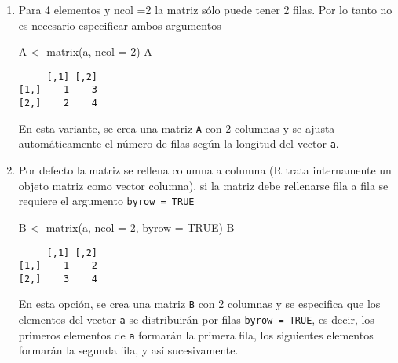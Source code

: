 \documentclass[
  a4paper,
]{article}
\newenvironment{Shaded}{}{}
\newcommand{\AttributeTok}[1]{\textcolor[rgb]{0.84,0.23,0.29}{#1}}
\newcommand{\ConstantTok}[1]{\textcolor[rgb]{0.00,0.36,0.77}{#1}}
\newcommand{\DecValTok}[1]{\textcolor[rgb]{0.00,0.36,0.77}{#1}}
\newcommand{\FunctionTok}[1]{\textcolor[rgb]{0.44,0.26,0.76}{#1}}
\newcommand{\NormalTok}[1]{\textcolor[rgb]{0.14,0.16,0.18}{#1}}
\newcommand{\OtherTok}[1]{\textcolor[rgb]{0.44,0.26,0.76}{#1}}
\begin{document}
\begin{enumerate}
\begin{verbatim}
     [,1] [,2]
[1,]    1    3
[2,]    2    4
\end{verbatim}

  Aquí se utiliza la función \texttt{matrix()} para crear una matriz
  \texttt{A} a partir de los elementos del vector \texttt{a}. Se
  especifica que la matriz tendrá 2 columnas y 2 filas. Los argumentos
  nrow y ncol indican el número de filas y el número de columnas de que
  consta la matriz resultante.
\item
  Para 4 elementos y ncol =2 la matriz sólo puede tener 2 filas. Por lo
  tanto no es necesario especificar ambos argumentos

\begin{Shaded}
\begin{Highlighting}[]
\NormalTok{A }\OtherTok{\textless{}{-}} \FunctionTok{matrix}\NormalTok{(a, }\AttributeTok{ncol =} \DecValTok{2}\NormalTok{)}
\NormalTok{A}
\end{Highlighting}
\end{Shaded}

\begin{verbatim}
     [,1] [,2]
[1,]    1    3
[2,]    2    4
\end{verbatim}

  En esta variante, se crea una matriz \texttt{A} con 2 columnas y se
  ajusta automáticamente el número de filas según la longitud del vector
  \texttt{a}.
\item
  Por defecto la matriz se rellena columna a columna (R trata
  internamente un objeto matriz como vector columna). si la matriz debe
  rellenarse fila a fila se requiere el argumento
  \texttt{byrow\ =\ TRUE}

\begin{Shaded}
\begin{Highlighting}[]
\NormalTok{B }\OtherTok{\textless{}{-}} \FunctionTok{matrix}\NormalTok{(a, }\AttributeTok{ncol =} \DecValTok{2}\NormalTok{, }\AttributeTok{byrow =} \ConstantTok{TRUE}\NormalTok{)}
\NormalTok{B}
\end{Highlighting}
\end{Shaded}

\begin{verbatim}
     [,1] [,2]
[1,]    1    2
[2,]    3    4
\end{verbatim}

  En esta opción, se crea una matriz \texttt{B} con 2 columnas y se
  especifica que los elementos del vector \texttt{a} se distribuirán por
  filas \texttt{byrow\ =\ TRUE}, es decir, los primeros elementos de
  \texttt{a} formarán la primera fila, los siguientes elementos formarán
  la segunda fila, y así sucesivamente.
\end{enumerate}
\end{document}
